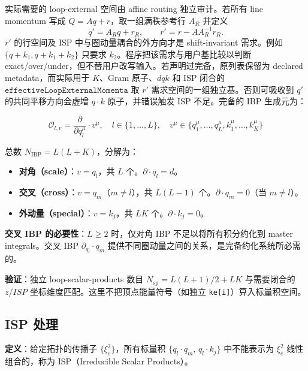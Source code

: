 ﻿\documentclass[a4paper,11pt]{article}
\begin{document}
实际需要的 loop-external 空间由 affine routing 独立审计。若所有 line momentum 写成 $Q=Aq+r$，取一组满秩参考行 $A_R$ 并定义
\begin{equation}
 q'=A_Rq+r_R,\qquad r'=r-AA_R^{-1}r_R.
 \label{affineRoutingInvariant}
\end{equation}
$r'$ 的行空间及 ISP 中与圈动量耦合的外方向才是 shift-invariant 需求。例如 $\{q+k_1,q+k_1+k_2\}$ 只要求 $k_2$。程序把该需求与用户基比较以判断 exact/over/under，但不替用户改写输入。若声明过完备，原列表保留为 declared metadata，而实际用于 $K$、Gram 原子、$dqk$ 和 ISP 闭合的 $\texttt{effectiveLoopExternalMomenta}$ 取 $r'$ 需求空间的一组独立基。否则可吸收到 $q'$ 的共同平移方向会虚增 $q\cdot k$ 原子，并错误触发 ISP 不足。完备的 IBP 生成元为：

\begin{equation}
  \mathcal{O}_{l,v} = \frac{\partial}{\partial q_l^\mu} \cdot v^\mu, \quad l \in \{1,\ldots,L\}, \quad v^\mu \in \{q_1^\mu, \ldots, q_L^\mu, k_1^\mu, \ldots, k_K^\mu\}
\end{equation}

总数 $N_{\text{IBP}} = L(L + K)$，分解为：

\begin{itemize}
  \item \textbf{对角（scale）}：$v = q_l$，共 $L$ 个。$\partial \cdot q_l = d$。
  \item \textbf{交叉（cross）}：$v = q_m$（$m \neq l$），共 $L(L-1)$ 个。$\partial \cdot q_m = 0$（当 $m \neq l$）。
  \item \textbf{外动量（special）}：$v = k_j$，共 $LK$ 个。$\partial \cdot k_j = 0$。
\end{itemize}

\textbf{交叉 IBP 的必要性}：$L \geq 2$ 时，仅对角 IBP 不足以将所有积分约化到 master integrals。交叉 IBP $\partial_{q_l} \cdot q_m$ 提供不同圈动量之间的关系，是完备约化系统所必需的。

\textbf{验证}：独立 loop-scalar-products 数目 $N_{\text{sp}} = L(L+1)/2 + LK$ 与需要闭合的 $z/ISP$ 坐标维度匹配。这里不把顶点能量符号（如独立 \texttt{ke[i]}）算入标量积空间。

\subsection{ISP 处理}

\textbf{定义}：给定拓扑的传播子 $\{\xi_e^2\}$，所有标量积 $\{q_l \cdot q_m,\, q_l \cdot k_j\}$ 中不能表示为 $\xi_e^2$ 线性组合的，称为 ISP（Irreducible Scalar Products）。
\end{document}
